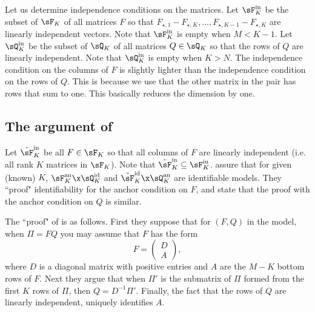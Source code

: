 \documentclass[12pt,a4paper]{article}
\begin{document}
 


Let us determine independence conditions on the matrices. Let $\sF_K^{\text{in}}$ be the subset of $\sF_K$ of all matrices $F$ so that  $F_{\star,1}-F_{\star,K},\ldots,F_{\star,K-1}-F_{\star,K}$ are linearly independent vectors. Note that $\sF_K^{\text{in}}$ is empty when $M<K-1$. 
    Let $\sQ_K^{\text{in}}$ be the subset of $\sQ_K$ of all matrices $Q\in\sQ_K$ so that the rows of $Q$ are linearly independent. Note that $\sQ_K^{\text{in}}$ is empty when $K>N$.  
    The independence condition on the columns of $F$ is slightly lighter than the independence condition on the rows of $Q$. This is because we use that the other matrix in the pair has rows that sum to one. This basically reduces the dimension by one. 
    
    
    \subsection{The argument of \cite{CabrerosStorey2019}}

Let $\tilde \sF_K^{\text{in}}$ be all $F\in \sF_K$ so that all columns of $F$ are linearly independent (i.e. all rank $K$ matrices in $\sF_K$). Note that $\tilde \sF_K^{\text{in}}\subseteq \sF_K^{\text{in}}$. 
\cite{CabrerosStorey2019} assure that for given (known) $K$, $\sF_K^{\text{an}}\x \sQ_K^{\text{id}}$ and $\tilde \sF_K^{\text{id}}\x \sQ_K^{\text{an}}$ are identifiable models.  They ``proof" identifiability for the anchor condition on $F$, and state that the proof with the anchor condition on $Q$ is similar. 
  
The ``proof" of \cite{CabrerosStorey2019} is as follows. First they suppose that for $(F,Q)$ in the model, when $\Pi = FQ$  you may assume that $F$ has the form \begin{equation}\label{eq:blockformofF}
    F = \begin{pmatrix}
        D \\ A
    \end{pmatrix},
\end{equation}
where $D$ is a diagonal matrix with positive entries and $A$ are the $M-K$ bottom rows of $F$. Next they argue that when $\Pi'$ is the submatrix of $\Pi$ formed from the first $K$ rows of $\Pi$, then $Q=D^{-1}\Pi'$. Finally, the fact that the rows of $Q$ are linearly independent, uniquely identifies $A$. 
\end{document}
